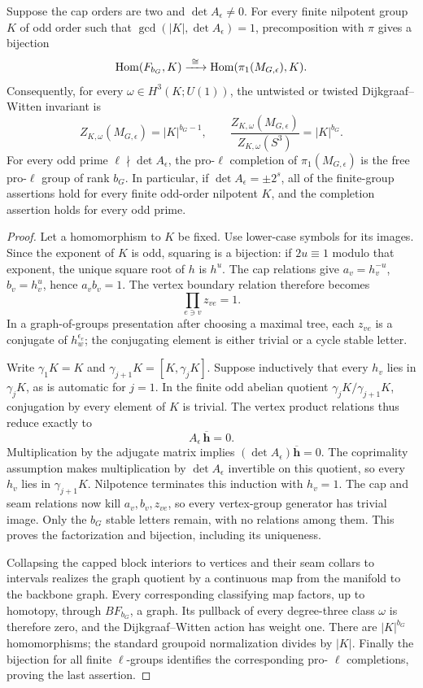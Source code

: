 \begin{theorem}
Suppose the cap orders are two and \(\det A_\epsilon\ne0\).
For every finite nilpotent group \(K\) of odd order such that
\(\gcd(|K|,\det A_\epsilon)=1\),
precomposition with \(\pi\) gives a bijection
\[
 \operatorname{Hom}(F_{b_G},K)\xrightarrow{\ \cong\ }
 \operatorname{Hom}(\pi_1(M_{G,\epsilon}),K).
\]
Consequently, for every \(\omega\in H^3(K;U(1))\), the untwisted or
twisted Dijkgraaf--Witten invariant is
\[
 Z_{K,\omega}(M_{G,\epsilon})=|K|^{b_G-1},\qquad
 \frac{Z_{K,\omega}(M_{G,\epsilon})}{Z_{K,\omega}(S^3)}=|K|^{b_G}.
\]
For every odd prime \(\ell\nmid\det A_\epsilon\), the pro-\(\ell\) completion of
\(\pi_1(M_{G,\epsilon})\) is the free pro-\(\ell\) group of rank
\(b_G\). In particular, if \(\det A_\epsilon=\pm2^s\), all of the
finite-group assertions hold for every finite odd-order nilpotent
\(K\), and the completion assertion holds for every odd prime.
\end{theorem}
\begin{proof}
Let a homomorphism to \(K\) be fixed. Use lower-case symbols for its
images. Since the exponent of \(K\) is odd, squaring is a bijection:
if \(2u\equiv1\) modulo that exponent, the unique square root of
\(h\) is \(h^u\). The cap relations give
\(a_v=h_v^{-u}\), \(b_v=h_v^u\), hence \(a_vb_v=1\).
The vertex boundary relation therefore becomes
\[
                  \prod_{e\ni v}z_{ve}=1.
\]
In a graph-of-groups presentation after choosing a maximal tree,
each \(z_{ve}\) is a conjugate of \(h_w^{\epsilon_e}\); the
conjugating element is either trivial or a cycle stable letter.

Write \(\gamma_1K=K\) and
\(\gamma_{j+1}K=[K,\gamma_jK]\). Suppose inductively that every
\(h_v\) lies in \(\gamma_jK\), as is automatic for \(j=1\).
In the finite odd abelian quotient \(\gamma_jK/\gamma_{j+1}K\),
conjugation by every element of \(K\) is trivial. The vertex product
relations thus reduce exactly to
\[
                 A_\epsilon\,\overline{\mathbf h}=0.
\]
Multiplication by the adjugate matrix implies
\((\det A_\epsilon)\overline{\mathbf h}=0\). The coprimality
assumption makes multiplication by \(\det A_\epsilon\) invertible
on this quotient, so every \(h_v\) lies in
\(\gamma_{j+1}K\). Nilpotence terminates this induction with
\(h_v=1\). The cap and seam relations now kill \(a_v,b_v,z_{ve}\),
so every vertex-group generator has trivial image. Only the
\(b_G\) stable letters remain, with no relations among them.
This proves the factorization and bijection, including its uniqueness.

Collapsing the capped block interiors to vertices and their seam
collars to intervals realizes the graph quotient by a continuous
map from the manifold to the backbone graph.
Every corresponding classifying map factors, up to homotopy, through
\(BF_{b_G}\), a graph. Its pullback of every degree-three class
\(\omega\) is therefore zero, and the Dijkgraaf--Witten action has
weight one. There are \(|K|^{b_G}\) homomorphisms; the standard
groupoid normalization divides by \(|K|\). Finally the bijection
for all finite \(\ell\)-groups identifies the corresponding pro-
\(\ell\) completions, proving the last assertion.
\end{proof}

